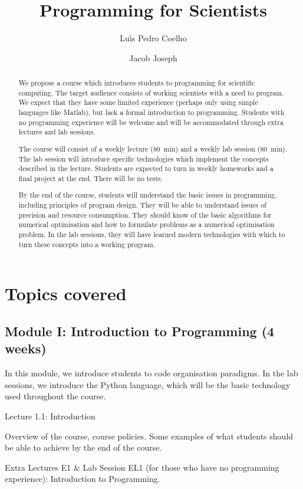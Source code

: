 \documentclass{article}
\title{Programming for Scientists}
\author{Lu\'\i s Pedro Coelho \and Jacob Joseph}
\begin{document}
\maketitle

\begin{abstract}
We propose a course which introduces students to programming for scientific computing. The target audience consists of working scientists with a need to program. We expect that they have some limited experience (perhaps only using simple languages like Matlab), but lack a formal introduction to programming. Students with no programming experience will be welcome and will be accommodated through extra lectures and lab sessions.

The course will consist of a weekly lecture (80~min) and a weekly lab session (80~min). The lab session will introduce specific technologies which implement the concepts described in the lecture. Students are expected to turn in weekly homeworks and a final project at the end. There will be no tests.

By the end of the course, students will understand the basic issues in programming, including principles of program design. They will be able to understand issues of precision and resource consumption. They should know of the basic algorithms for numerical optimisation and how to formulate problems as a numerical optimisation problem. In the lab sessions, they will have learned modern technologies with which to turn these concepts into a working program.
\end{abstract}

\section{Topics covered}

\subsection{Module I: Introduction to Programming (4 weeks)}

In this module, we introduce students to code organisation paradigms. In the lab sessions, we introduce the Python language, which will be the basic technology used throughout the course.

Lecture 1.1: Introduction

Overview of the course, course policies. Some examples of what students should be able to achieve by the end of the course.

Extra Lectures E1 \& Lab Session EL1 (for those who have no programming experience): Introduction to Programming.
\end{document}
